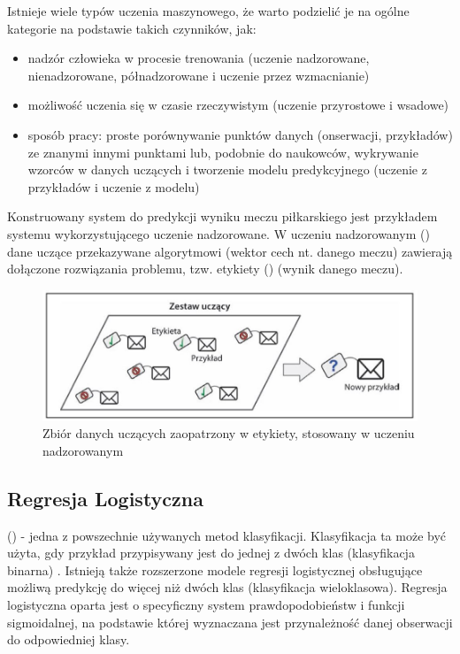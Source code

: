 Istnieje wiele typów uczenia maszynowego, że warto podzielić je na ogólne kategorie na podstawie takich czynników, jak:
\begin{itemize}
    \item nadzór człowieka w procesie trenowania (uczenie nadzorowane, nienadzorowane, półnadzorowane i uczenie przez wzmacnianie)
    \item możliwość uczenia się w czasie rzeczywistym (uczenie przyrostowe i wsadowe)
    \item sposób pracy: proste porównywanie punktów danych (onserwacji, przykładów) ze znanymi innymi punktami lub, podobnie do naukowców, wykrywanie wzorców w danych uczących i tworzenie modelu predykcyjnego (uczenie z przykładów i uczenie z modelu)
\end{itemize}

Konstruowany system do predykcji wyniku meczu piłkarskiego jest przykładem systemu wykorzystującego uczenie nadzorowane. W uczeniu nadzorowanym () dane uczące przekazywane algorytmowi (wektor cech nt. danego meczu) zawierają dołączone rozwiązania problemu, tzw. etykiety () (wynik danego meczu). \cite{Geron}

\begin{figure}[h] 
        \includegraphics[width=15cm]{figures/supervised-learning.JPG}
        \caption{Zbiór danych uczących zaopatrzony w etykiety, stosowany w uczeniu nadzorowanym}
\end{figure}

\newpage

\subsection{Regresja Logistyczna}
 () - jedna z powszechnie używanych metod klasyfikacji. Klasyfikacja ta może być użyta, gdy przykład przypisywany jest do jednej z dwóch klas (klasyfikacja binarna) \cite{PPlonski}. Istnieją także rozszerzone modele regresji logistycznej obsługujące możliwą predykcję do więcej niż dwóch klas (klasyfikacja wieloklasowa). Regresja logistyczna oparta jest o specyficzny system prawdopodobieństw i funkcji sigmoidalnej, na podstawie której wyznaczana jest przynależność danej obserwacji do odpowiedniej klasy.\\


